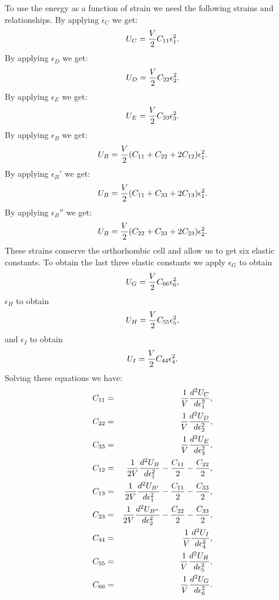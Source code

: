\documentclass[12pt,a4paper]{article}
\begin{document}
To use the energy as a function of strain we need the following strains
and relationships. 
By applying $\epsilon_C$ we get:
\begin{equation}
U_C= {V \over 2} C_{11} \epsilon_1^2.
\end{equation}
By applying $\epsilon_D$ we get:
\begin{equation}
U_D= {V \over 2} C_{22} \epsilon_2^2.
\end{equation}
By applying $\epsilon_E$ we get:
\begin{equation}
U_E= {V \over 2} C_{33} \epsilon_3^2.
\end{equation}
By applying $\epsilon_B$ we get:
\begin{equation}
U_B= {V \over 2} (C_{11} + C_{22} + 2 C_{12}) \epsilon_1^2.
\end{equation}
By applying $\epsilon_B'$ we get: 
\begin{equation}
U_B= {V \over 2} (C_{11} + C_{33} + 2 C_{13}) \epsilon_1^2.
\end{equation}
By applying $\epsilon_B''$ we get:
\begin{equation}
U_B= {V \over 2} (C_{22} + C_{33} + 2 C_{23}) \epsilon_2^2.
\end{equation}
These strains conserve the orthorhombic cell and allow us to get
six elastic constants. To obtain the last three elastic constants we 
apply $\epsilon_G$ to obtain
\begin{equation}
U_G= {V \over 2} C_{66} \epsilon_6^2,
\end{equation}
$\epsilon_H$ to obtain
\begin{equation}
U_H= {V \over 2} C_{55} \epsilon_5^2,
\end{equation}
and $\epsilon_I$ to obtain
\begin{equation}
U_I= {V \over 2} C_{44} \epsilon_4^2.
\end{equation}
Solving these equations we have:
\begin{eqnarray}
C_{11}&=&{1 \over V} {d^2 U_C \over d \epsilon_1^2}, \\ 
C_{22}&=&{1 \over V} {d^2 U_D \over d \epsilon_2^2}, \\ 
C_{33}&=&{1 \over V} {d^2 U_E \over d \epsilon_3^2}, \\ 
C_{12}&=&{1 \over 2 V} {d^2 U_B \over d \epsilon_1^2} - {C_{11}\over 2} - 
{C_{22}\over 2}, \\
C_{13}&=&{1 \over 2 V} {d^2 U_{B'} \over d \epsilon_1^2} - {C_{11}\over 2} - {C_{33} \over 2}, \\
C_{23}&=&{1 \over 2 V} {d^2 U_{B''} \over d \epsilon_2^2} - {C_{22}\over 2} - {C_{33} \over 2}, \\
C_{44}&=&{1 \over V} {d^2 U_I \over d \epsilon_4^2}, \\
C_{55}&=&{1 \over V} {d^2 U_H \over d \epsilon_5^2}, \\
C_{66}&=&{1 \over V} {d^2 U_G \over d \epsilon_6^2}.
\end{eqnarray}
\end{document}
